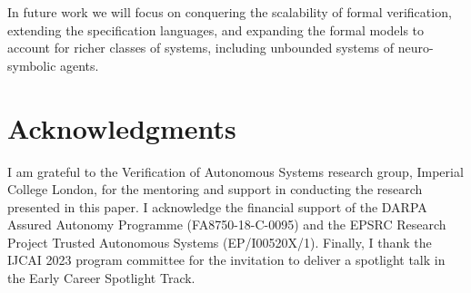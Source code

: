 \documentclass{article}
\begin{document}
In future work we will focus on conquering the scalability of formal
verification, extending the specification languages, and  expanding the formal
models to account for richer classes of systems, including unbounded systems of 
neuro-symbolic agents.


\section*{Acknowledgments}

I am grateful to the Verification of Autonomous Systems research group, Imperial
College London, for the mentoring and support in conducting the research
presented in this paper. I acknowledge the financial support of the DARPA
Assured Autonomy Programme (FA8750-18-C-0095) and the EPSRC Research Project
Trusted Autonomous Systems (EP/I00520X/1). Finally, I thank the IJCAI 2023 program
committee for the  invitation to deliver a spotlight talk in the Early Career
Spotlight Track.





\end{document}
